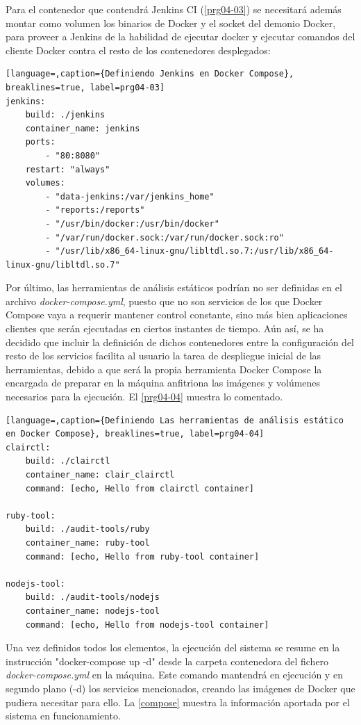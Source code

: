 Para el contenedor que contendrá Jenkins \gls{CI} (\autoref{prg04-03}) se necesitará además montar como volumen los binarios de Docker y el socket del demonio Docker, para proveer a Jenkins de la habilidad de ejecutar docker y ejecutar comandos del cliente Docker contra el resto de los contenedores desplegados:

\begin{lstlisting}[language=,caption={Definiendo Jenkins en Docker Compose}, breaklines=true, label=prg04-03]
jenkins:
	build: ./jenkins
	container_name: jenkins
	ports:
		- "80:8080"
	restart: "always"
	volumes:
		- "data-jenkins:/var/jenkins_home"
		- "reports:/reports"
		- "/usr/bin/docker:/usr/bin/docker"
		- "/var/run/docker.sock:/var/run/docker.sock:ro"
		- "/usr/lib/x86_64-linux-gnu/libltdl.so.7:/usr/lib/x86_64-linux-gnu/libltdl.so.7"
\end{lstlisting}

Por último, las herramientas de análisis estáticos podrían no ser definidas en el archivo \textit{docker-compose.yml}, puesto que no son servicios de los que Docker Compose vaya a requerir mantener control constante, sino más bien aplicaciones clientes que serán ejecutadas en ciertos instantes de tiempo. Aún así, se ha decidido que incluir la definición de dichos contenedores entre la configuración del resto de los servicios facilita al usuario la tarea de despliegue inicial de las herramientas, debido a que será la propia herramienta Docker Compose la encargada de preparar en la máquina anfitriona las imágenes y volúmenes necesarios para la ejecución. El \autoref{prg04-04} muestra lo comentado.

\begin{lstlisting}[language=,caption={Definiendo Las herramientas de análisis estático en Docker Compose}, breaklines=true, label=prg04-04]
clairctl:
	build: ./clairctl
	container_name: clair_clairctl
	command: [echo, Hello from clairctl container]

ruby-tool:
	build: ./audit-tools/ruby
	container_name: ruby-tool
	command: [echo, Hello from ruby-tool container]

nodejs-tool:
	build: ./audit-tools/nodejs
	container_name: nodejs-tool
	command: [echo, Hello from nodejs-tool container]
\end{lstlisting}

Una vez definidos todos los elementos, la ejecución del sistema se resume en la instrucción "docker-compose up -d" desde la carpeta contenedora del fichero \textit{docker-compose.yml} en la máquina. Este comando mantendrá en ejecución y en segundo plano (-d) los servicios mencionados, creando las imágenes de Docker que pudiera necesitar para ello. La \autoref{compose} muestra la información aportada por el sistema en funcionamiento.

